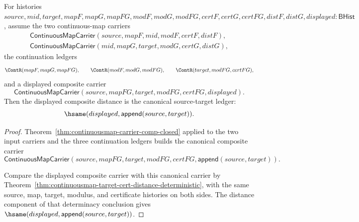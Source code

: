 \begin{theorem}
\label{thm:continuousmap-carrier-comp-distance-deterministic}
For histories
$source,mid,target,mapF,mapG,mapFG,modF,modG,modFG,certF,certG,certFG,distF,distG,displayed:\mathsf{BHist}$,
assume the two continuous-map carriers
$$
\begin{array}{l}
\mathsf{ContinuousMapCarrier}(source,mapF,mid,modF,certF,distF),\\
\mathsf{ContinuousMapCarrier}(mid,mapG,target,modG,certG,distG),
\end{array}
$$
the continuation ledgers
$$
\ContR(mapF,mapG,mapFG),\qquad
\ContR(modF,modG,modFG),\qquad
\ContR(target,modFG,certFG),
$$
and a displayed composite carrier
$$
\mathsf{ContinuousMapCarrier}(source,mapFG,target,modFG,certFG,displayed).
$$
Then the displayed composite distance is the canonical source-target ledger:
$$
\hsame(displayed,\mathsf{append}(source,target)).
$$
\end{theorem}
\begin{proof}
Theorem~\ref{thm:continuousmap-carrier-comp-closed} applied to the two input
carriers and the three continuation ledgers builds the canonical composite
carrier
$$
\mathsf{ContinuousMapCarrier}
(source,mapFG,target,modFG,certFG,\mathsf{append}(source,target)).
$$

Compare the displayed composite carrier with this canonical carrier by
Theorem~\ref{thm:continuousmap-target-cert-distance-deterministic}, with the
same source, map, target, modulus, and certificate histories on both sides.
The distance component of that determinacy conclusion gives
$\hsame(displayed,\mathsf{append}(source,target))$.
\end{proof}

